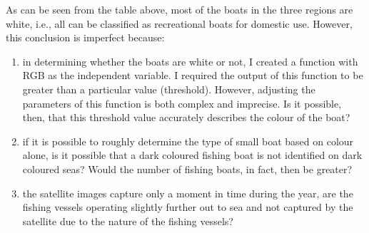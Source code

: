 As can be seen from the table above, most of the boats in the three regions are white, i.e., all can be classified as recreational boats for domestic use. However, this conclusion is imperfect because:

\begin{enumerate}
    \item in determining whether the boats are white or not, I created a function with RGB as the independent variable. I required the output of this function to be greater than a particular value (threshold). However, adjusting the parameters of this function is both complex and imprecise. Is it possible, then, that this threshold value accurately describes the colour of the boat?
    
    \item if it is possible to roughly determine the type of small boat based on colour alone, is it possible that a dark coloured fishing boat is not identified on dark coloured seas? Would the number of fishing boats, in fact, then be greater?
    
    \item the satellite images capture only a moment in time during the year, are the fishing vessels operating slightly further out to sea and not captured by the satellite due to the nature of the fishing vessels?
\end{enumerate}

